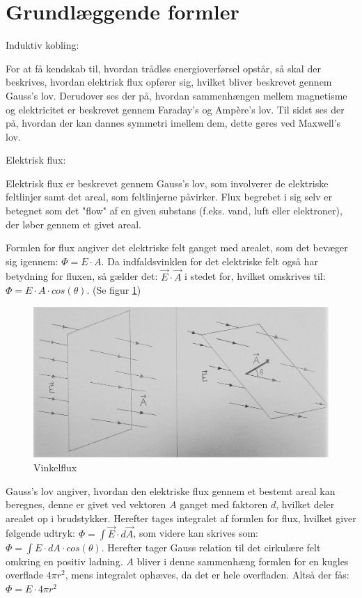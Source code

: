 \section{Grundlæggende formler}

Induktiv kobling:

For at få kendskab til, hvordan trådløs energioverførsel opstår, så skal der beskrives, hvordan elektrisk flux opfører sig, hvilket bliver beskrevet gennem Gauss's lov. Derudover ses der på, hvordan sammenhængen mellem magnetisme og elektricitet er beskrevet gennem Faraday's og Ampère's lov. Til sidst ses der på, hvordan der kan dannes symmetri imellem dem, dette gøres ved Maxwell's lov.

Elektrisk flux:

Elektrisk flux er beskrevet gennem Gauss's lov, som involverer de elektriske feltlinjer samt det areal, som feltlinjerne påvirker. Flux begrebet i sig selv er betegnet som det "flow" af en given substans (f.eks. vand, luft eller elektroner), der løber gennem et givet areal.

Formlen for flux angiver det elektriske felt ganget med arealet, som det bevæger sig igennem: $\Phi = E \cdot A$. Da indfaldsvinklen for det elektriske felt også har betydning for fluxen, så gælder det: $\vec{E} \cdot \vec{A}$ i stedet for, hvilket omskrives til: $\Phi = E \cdot A \cdot cos(\theta)$. (Se figur \ref{vinkelflux})

\begin{figure}[H]
\centering
\includegraphics[scale=0.5]{Vildledning/Schematics/Vinkelflux}
\caption{Vinkelflux}
\label{vinkelflux}
\end{figure}

Gauss's lov angiver, hvordan den elektriske flux gennem et bestemt areal kan beregnes, denne er givet ved vektoren $A$ ganget med faktoren $d$, hvilket deler arealet op i brudstykker. Herefter tages integralet af formlen for flux, hvilket giver følgende udtryk: $\Phi = \int \vec{E} \cdot d \vec{A}$, som videre kan skrives som: $\Phi = \int E \cdot dA \cdot cos(\theta)$. Herefter tager Gauss relation til det cirkulære felt omkring en positiv ladning. $A$ bliver i denne sammenhæng formlen for en kugles overflade $4 \pi r^2$, mens integralet ophæves, da det er hele overfladen. Altså der fås: $\Phi = E \cdot 4 \pi r^2$

